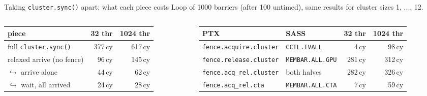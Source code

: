 \documentclass[aspectratio=169, numbering=fraction]{beamer}
\begin{document}
\begin{frame}{Taking \texttt{cluster.sync()} apart: what each piece costs}
  \scriptsize
  Loop of 1000 barriers (after 100 untimed), same results for cluster sizes 1, ..., 12.
  
  \vspace{1em}
  \setlength{\tabcolsep}{3pt}
  \begin{columns}[t,onlytextwidth]
    \begin{column}{0.42\textwidth}
      \begin{tabular}{@{}lrr@{}}
        \toprule
        piece & 32 thr & 1024 thr \\
        \midrule
        full \texttt{cluster.sync()}              & 377\,cy & 617\,cy \\
        relaxed arrive (no fence)                 & 96\,cy  & 145\,cy \\
        \quad $\hookrightarrow$ arrive alone      & 44\,cy  & 62\,cy \\
        \quad $\hookrightarrow$ wait, all arrived & 24\,cy  & 28\,cy \\
        \bottomrule
      \end{tabular}
    \end{column}
    \begin{column}{0.56\textwidth}
      \begin{tabular}{@{}llrr@{}}
        \toprule
        PTX & SASS & 32 thr & 1024 thr \\
        \midrule
        \texttt{fence.acquire.cluster}  & \texttt{CCTL.IVALL}     & 4\,cy   & 98\,cy \\
        \texttt{fence.release.cluster}  & \texttt{MEMBAR.ALL.GPU} & 281\,cy & 312\,cy \\
        \texttt{fence.acq\_rel.cluster} & both halves             & 282\,cy & 326\,cy \\
        \texttt{fence.acq\_rel.cta}     & \texttt{MEMBAR.ALL.CTA} & 7\,cy   & 59\,cy \\
        \bottomrule
      \end{tabular}
    \end{column}
  \end{columns}


\end{frame}
\end{document}
